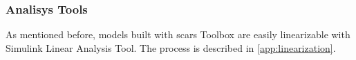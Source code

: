     
    \subsubsection{Analisys Tools}
        As mentioned before, models built with \ac{scars} Toolbox are easily linearizable with Simulink Linear Analysis Tool. The process is described in \autoref{app:linearization}. 